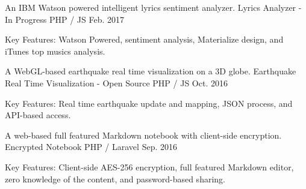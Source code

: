 

\begin{cventries}
    \cventry
    {An IBM Watson powered intelligent lyrics sentiment analyzer.} %
    {Lyrics Analyzer - In Progress} %
    {PHP / JS} %
    {Feb. 2017} %
    {
      \begin{cvitems} %
          \item {Key Features: Watson Powered, sentiment analysis, Materialize design, and iTunes top musics analysis.}
      \end{cvitems}
    }

    \cventry
    {A WebGL-based earthquake real time visualization on a 3D globe.} %
    {Earthquake Real Time Visualization - Open Source} %
    {PHP / JS} %
    {Oct. 2016} %
    {
      \begin{cvitems} %
          \item {Key Features: Real time earthquake update and mapping, JSON process, and API-based access.}
      \end{cvitems}
    }

    \cventry
    {A web-based full featured Markdown notebook with client-side encryption.} %
    {Encrypted Notebook} %
    {PHP / Laravel} %
    {Sep. 2016} %
    {
      \begin{cvitems} %
          \item {Key Features: Client-side AES-256 encryption, full featured Markdown editor,  zero knowledge of the content, and password-based sharing.}
      \end{cvitems}
    }


\end{cventries}
